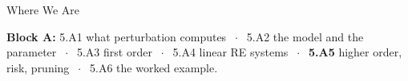 

\graphicspath{{./figures/}}





\makedecktitle

\begin{frame}{Where We Are}
\vspace{-1mm}
\begin{center}
\small \textbf{Block A:} 5.A1 what perturbation computes $\;\cdot\;$ 5.A2 the model and the parameter $\;\cdot\;$ 5.A3 first order $\;\cdot\;$ 5.A4 linear RE systems $\;\cdot\;$ \textbf{5.A5} higher order, risk, pruning $\;\cdot\;$ 5.A6 the worked example.
\end{center}
\end{frame}

